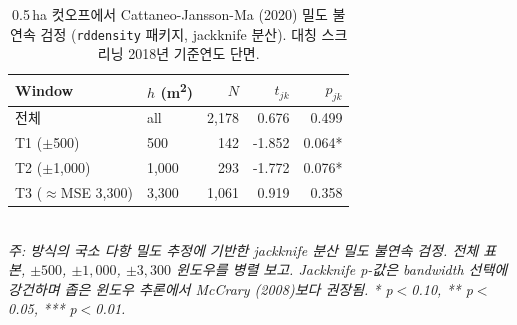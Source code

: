 \begin{table}[t]
\centering
\caption{0.5\,ha 컷오프에서 Cattaneo-Jansson-Ma (2020) 밀도 불연속 검정 (\texttt{rddensity} 패키지, jackknife 분산). 대칭 스크리닝 2018년 기준연도 단면.}
\label{tab:cjm_density_ko}
\begin{tabular}{llrrr}
\toprule
Window & $h$ (m\textsuperscript{2}) & $N$ & $t_{jk}$ & $p_{jk}$ \\
\midrule
전체 & all & 2,178 & 0.676 & 0.499 \\
T1 ($\pm$500) & 500 & 142 & -1.852 & 0.064* \\
T2 ($\pm$1,000) & 1,000 & 293 & -1.772 & 0.076* \\
T3 ($\approx$MSE 3,300) & 3,300 & 1,061 & 0.919 & 0.358 \\
\bottomrule
\end{tabular}
\\
\footnotesize\textit{주: \citet{CalonicoCattaneoTitiunik2014_rdrobust} 방식의 국소 다항 밀도 추정에 기반한 jackknife 분산 밀도 불연속 검정. 전체 표본, $\pm 500$, $\pm 1{,}000$, $\pm 3{,}300$ 윈도우를 병렬 보고. Jackknife p-값은 bandwidth 선택에 강건하며 좁은 윈도우 추론에서 McCrary (2008)보다 권장됨. * p$<$0.10, ** p$<$0.05, *** p$<$0.01.}
\end{table}
